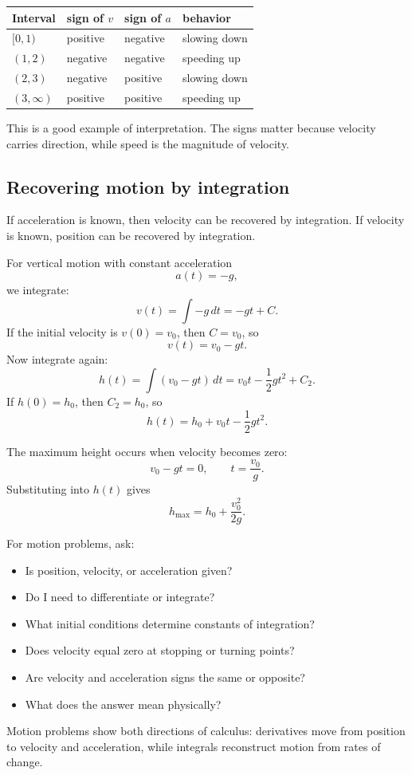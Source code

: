 \begin{center}
\begin{tabular}{llll}
\toprule
Interval & sign of \(v\) & sign of \(a\) & behavior \\
\midrule
\([0,1)\) & positive & negative & slowing down \\
\((1,2)\) & negative & negative & speeding up \\
\((2,3)\) & negative & positive & slowing down \\
\((3,\infty)\) & positive & positive & speeding up \\
\bottomrule
\end{tabular}
\end{center}

This is a good example of interpretation. The signs matter because velocity carries direction, while speed is the magnitude of velocity.

\subsection*{Recovering motion by integration}

If acceleration is known, then velocity can be recovered by integration. If velocity is known, position can be recovered by integration.

For vertical motion with constant acceleration
\[
a(t)=-g,
\]
we integrate:
\[
v(t)=\int -g\,dt=-gt+C.
\]
If the initial velocity is \(v(0)=v_0\), then \(C=v_0\), so
\[
v(t)=v_0-gt.
\]
Now integrate again:
\[
h(t)=\int (v_0-gt)\,dt=v_0t-\frac12gt^2+C_2.
\]
If \(h(0)=h_0\), then \(C_2=h_0\), so
\[
h(t)=h_0+v_0t-\frac12gt^2.
\]

The maximum height occurs when velocity becomes zero:
\[
v_0-gt=0,
\qquad
 t=\frac{v_0}{g}.
\]
Substituting into \(h(t)\) gives
\[
h_{\max}=h_0+\frac{v_0^2}{2g}.
\]

\begin{summarybox}
For motion problems, ask:
\begin{itemize}
\item Is position, velocity, or acceleration given?
\item Do I need to differentiate or integrate?
\item What initial conditions determine constants of integration?
\item Does velocity equal zero at stopping or turning points?
\item Are velocity and acceleration signs the same or opposite?
\item What does the answer mean physically?
\end{itemize}
\end{summarybox}

Motion problems show both directions of calculus: derivatives move from position to velocity and acceleration, while integrals reconstruct motion from rates of change.